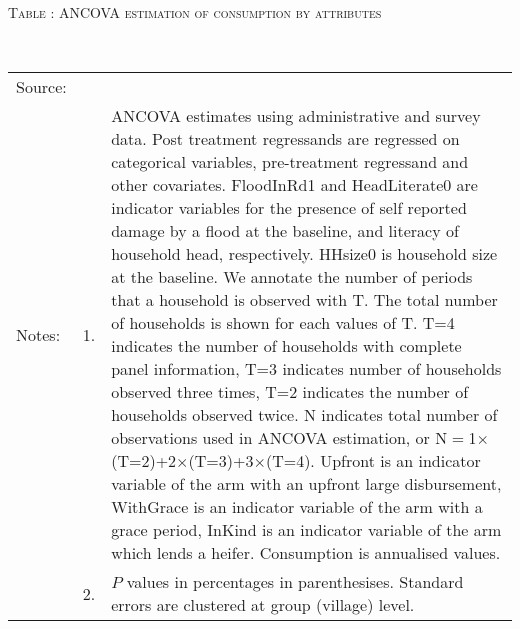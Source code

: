\hspace{-1cm}\begin{minipage}[t]{14cm}
\hfil\textsc{\normalsize Table \thetable: ANCOVA estimation of consumption by attributes \label{tab ANCOVA consumption attributes original HH}}\\
\setlength{\tabcolsep}{1pt}
\setlength{\baselineskip}{8pt}
\renewcommand{\arraystretch}{.55}
\hfil{}\\
\renewcommand{\arraystretch}{.8}
\setlength{\tabcolsep}{1pt}
\begin{tabular}{>{\hfill\scriptsize}p{1cm}<{}>{\hfill\scriptsize}p{.25cm}<{}>{\scriptsize}p{12cm}<{\hfill}}
Source:& \multicolumn{2}{l}{\scriptsize Estimated with GUK administrative and survey data.}\\
Notes: & 1. & ANCOVA estimates using administrative and survey data. Post treatment regressands are regressed on categorical variables, pre-treatment regressand and other covariates. \textsf{FloodInRd1} and \textsf{HeadLiterate0} are indicator variables for the presence of self reported damage by a flood at the baseline, and literacy of household head, respectively. \textsf{HHsize0} is household size at the baseline. We annotate the number of periods that a household is observed with \textsf{T}. The total number of households is shown for each values of \textsf{T}. \textsf{T=4} indicates the number of households with complete panel information, \textsf{T=3} indicates number of households observed three times, \textsf{T=2} indicates the number of households observed twice. \textsf{N} indicates total number of observations used in ANCOVA estimation, or \textsf{N$=$1$\times$(T=2)+2$\times$(T=3)+3$\times$(T=4)}.  \textsf{Upfront} is an indicator variable of the arm with an upfront large disbursement, \textsf{WithGrace} is an indicator variable of the arm with a grace period, \textsf{InKind} is an indicator variable of the arm which lends a heifer. Consumption is annualised values. \\
& 2. & $P$ values in percentages in parenthesises. Standard errors are clustered at group (village) level.
\end{tabular}
\end{minipage}



